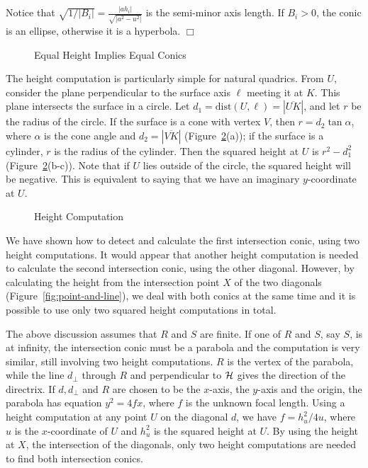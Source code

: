 \begin{remark}\rm
\label{rmk:minor}
Notice that $\sqrt{1/|B_i|} = \frac{|ah_i|}{\sqrt{|a^2 - u^2|}}$
is the semi-minor axis length.
If $B_i>0$, the conic is an ellipse, otherwise it is a hyperbola.
$\Box$
\end{remark}

\begin{figure}
\vspace{4cm}
\caption{Equal Height Implies Equal Conics}
\label{fig:heights}
\end{figure}

     The height computation is particularly simple for natural quadrics.  From
$U$, consider the plane
perpendicular to the surface axis $\ell$ meeting it at $K$.  This plane
intersects the surface in a circle.
Let $d_1=\mbox{dist}(U,\ell)=|\overline{UK}|$,
and let $r$ be the radius of the circle.
If the surface is a cone with vertex $V$,
then $r = d_2\tan\alpha$, where $\alpha$ is the cone angle and
$d_2=|\overline{VK}|$ (Figure~\ref{fig:height-comp}(a));
if the surface is a cylinder, $r$ is the radius of the cylinder.
Then the squared height at $U$ is $r^2-d_1^2$
(Figure~\ref{fig:height-comp}(b-c)).
Note that if $U$ lies outside of the
circle, the squared height will be negative.  This is equivalent to saying that
we have an imaginary $y$-coordinate at $U$.


\begin{figure}
\vspace{5cm}
\caption{Height Computation}
\label{fig:height-comp}
\end{figure}

We have shown how to detect and calculate the first intersection conic,
using two height computations.
It would appear that another height computation is needed to calculate the
second intersection conic, using the other diagonal.
However, by calculating the height from the intersection point $X$ of the
two diagonals (Figure~\ref{fig:point-and-line}),
we deal with both conics at the same time and
it is possible to use only two squared height computations in total.

     The above discussion assumes that $R$ and $S$ are finite.  If one of $R$
and $S$, say $S$, is at infinity, the intersection conic must be a parabola
and the computation is very similar, still involving two  height computations.
$R$ is the vertex of the parabola, while the line $d_\perp$ through $R$ and
perpendicular to ${\cal H}$ gives the direction of the directrix.
If $d,d_\perp$ and $R$ are chosen to be the $x$-axis, the $y$-axis and the
origin, the parabola has equation $y^2=4fx$, where $f$ is the unknown focal
length.  Using a height computation at any point $U$ on the diagonal $d$,
we have $f=h_u^2/4u$, where $u$ is the $x$-coordinate of $U$
and $h_u^2$ is the squared height at $U$.
By using the height at $X$, the intersection of the diagonals, only
two height computations are needed to find both intersection
conics.

